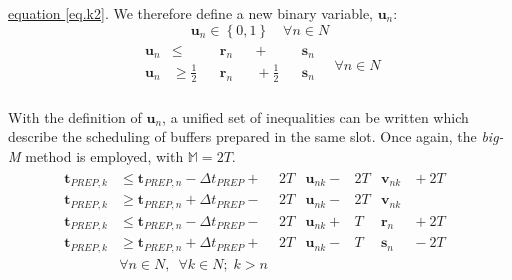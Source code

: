 \hyperref[eq.k2]{equation \ref*{eq.k2}}.
We therefore define a new binary variable, $\boldsymbol{u}_{n}$:
\begin{equation}
    \boldsymbol{u}_{n} \in \left\{ 0, 1 \right\} \quad \forall n \in N
    \label{eq.u1}
\end{equation}
\begin{equation}
    \begin{split}
        \begin{alignedat}{8}
            \boldsymbol{u}_{n} &\le &&\boldsymbol{r}_{n}
            && {}+{} &&\boldsymbol{s}_{n}\\
            \boldsymbol{u}_{n} &\ge \tfrac{1}{2} &&\boldsymbol{r}_{n}
            && {}+{} \tfrac{1}{2} &&\boldsymbol{s}_{n}\\
        \end{alignedat}
        \quad \forall n \in N
    \end{split}
    \label{eq.u2}
\end{equation}

With the definition of $\boldsymbol{u}_{n}$, a unified set of inequalities can
be written which describe the scheduling of buffers prepared in the same slot.
Once again, the \emph{big-M} method is employed, with $\mathbb{M} = 2T$.
\begin{equation}
    \begin{split}
        \begin{alignedat}{10}
            \boldsymbol{t}_{\mathit{PREP},k}
            &\le \boldsymbol{t}_{\mathit{PREP},n}
            - \Delta t_{\mathit{PREP}} {}+{} & 2T &\boldsymbol{u}_{nk}
            {}-{} & 2T &\boldsymbol{v}_{nk} & {}+{} 2T&\\
            \boldsymbol{t}_{\mathit{PREP},k}
            &\ge \boldsymbol{t}_{\mathit{PREP},n}
            + \Delta t_{\mathit{PREP}} {}-{} & 2T &\boldsymbol{u}_{nk}
            {}-{} & 2T &\boldsymbol{v}_{nk}&\\
            \boldsymbol{t}_{\mathit{PREP},k}
            &\le \boldsymbol{t}_{\mathit{PREP},n}
            - \Delta t_{\mathit{PREP}} {}-{} & 2T &\boldsymbol{u}_{nk}
            {}+{} & T &\boldsymbol{r}_{n} & {}+{} 2T&\\
            \boldsymbol{t}_{\mathit{PREP},k}
            &\ge \boldsymbol{t}_{\mathit{PREP},n}
            + \Delta t_{\mathit{PREP}} {}+{} & 2T &\boldsymbol{u}_{nk}
            {}-{} & T &\boldsymbol{s}_{n} & {}-{} 2T&\\
            &\forall n \in N, \enspace \forall k \in N; \; k > n
            \end{alignedat}            
    \end{split}
    \label{eq.k4}
\end{equation}

